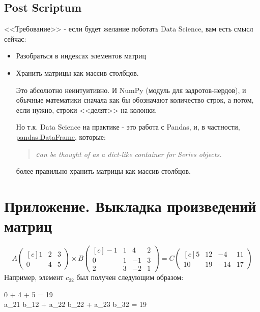 	\subsection{Post Scriptum}
	<<Требование>> - если будет желание поботать Data Science, вам есть смысл сейчас:
	\begin{itemize}
		\item Разобраться в индексах элементов матриц
		\item Хранить матрицы как массив столбцов.
		
		Это абсолютно неинтуитивно. И NumPy (модуль для задротов-нердов), и обычные математики сначала как бы обозначают количество строк, а потом, если нужно, строки <<делят>> на колонки. 
		
		Но т.к. Data Science на практике - это работа с Pandas, и, в частности, \href{https://pandas.pydata.org/docs/reference/api/pandas.DataFrame.html#pandas.DataFrame}{pandas.DataFrame}, которые:
		\begin{quotation}\begin{center}
			\textit{сan be thought of as a dict-like container for Series objects.}
		\end{center}\end{quotation}
		более правильно хранить матрицы как массив столбцов.
	\end{itemize}
	
	\section{Приложение. Выкладка произведений матриц}
		\[	A
			\begin{pmatrix*}[c]
				1 & 2 & 3 \\
				0 & 4 & 5
			\end{pmatrix*}
			\times
			B
			\begin{pmatrix*}[c]
				-1 & 1 & 4 & 2 \\
				0 & 1 & -1 & 3 \\
				2 & 3 & -2 & 1
			\end{pmatrix*}
			= C
			\begin{pmatrix*}[c]
				5 & 12 & -4 & 11 \\
				10 & 19 & -14 & 17
			\end{pmatrix*}
		\]
		Например, элемент $c_{22}$ был получен следующим образом:
		\begin{eq_array}
			0  \cdot 1  + 4  + 5  = 19 \\
			a_{21} \cdot b_{12} + a_{22} \cdot b_{22} + a_{23} \cdot b_{32} = 19
		\end{eq_array}
		

